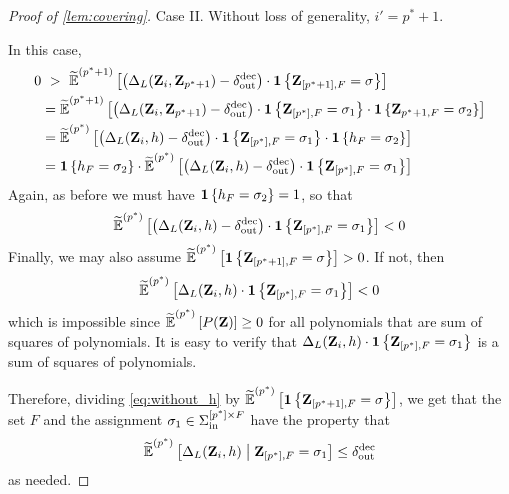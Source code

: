 \begin{proof}[Proof of \cref{lem:covering}]
\medskip
%	
\noindent Case II. Without loss of generality, $i'=p^*+1$.
	
%	
In this case,
	\begin{align*}
		0 &~>~  \pcod{p^*+1}{ \inparen{\Delta_L(\zee_i,\zee_{p^*+1}) - \delta_{\out}^{\dec}} \cdot \indi{\zee_{[p^*+1],F} = \sigma}} \\
		&=  \pcod{p^*+1}{ \inparen{\Delta_L(\zee_i,\zee_{p^*+1}) - \delta_{\out}^{\dec}} \cdot \indi{\zee_{[p^*],F} = \sigma_1} \cdot \indi{\zee_{p^*+1,F} = \sigma_2}} \\
		&=\pcod{p^*}{ \inparen{\Delta_L(\zee_i,h) - \delta_{\out}^{\dec}} \cdot \indi{\zee_{[p^*],F} = \sigma_1} \cdot \indi{h_F = \sigma_2}}\\
		&=\indi{h_F = \sigma_2} \cdot \pcod{p^*}{ \inparen{\Delta_L(\zee_i,h) - \delta_{\out}^{\dec}} \cdot \indi{\zee_{[p^*],F} = \sigma_1}}\\
	\end{align*}
	Again, as before we must have $\indi{h_F = \sigma_2} =1$, so that
	\begin{align}\label{eq:without_h}
		\pcod{p^*}{ \inparen{\Delta_L(\zee_i,h) - \delta_{\out}^{\dec}} \cdot \indi{\zee_{[p^*],F} = \sigma_1}} < 0
	\end{align}
	Finally, we may also assume $\pcod{p^*}{\indi{\zee_{[p^*+1],F} =\sigma}} >0$. If not, then
	\[
		\pcod{p^*}{ \Delta_L(\zee_i,h) \cdot \indi{\zee_{[p^*],F} = \sigma_1}} < 0
	\]
	which is impossible since $\pcod{p^*}{P(\zee)} \geq 0$ for all polynomials that are sum of squares of polynomials. It is easy to verify that $\Delta_L(\zee_i,h) \cdot \indi{\zee_{[p^*],F} = \sigma_1}$ is a sum of squares of polynomials.
	
	Therefore, dividing \cref{eq:without_h} by $\pcod{p^*}{\indi{\zee_{[p^*+1],F} =\sigma}}$, we get that the set $F$ and the assignment $\sigma_1 \in \Sigma_{\inn}^{[p^*] \times F}$ have the property that
	\[
		\pcod{p^*}{\Delta_L(\zee_i,h) \given \zee_{[p^*],F} = \sigma_1} \leq \delta_{\out}^{\dec}
	\]
	as needed.
\end{proof}

